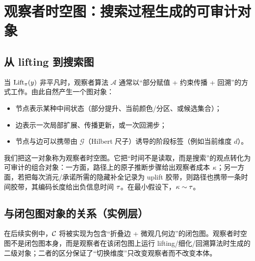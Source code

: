 \section{观察者时空图：搜索过程生成的可审计对象}

\subsection{从 lifting 到搜索图}

当 \(\mathrm{Lift}_{\pi}(y)\) 非平凡时，观察者算法 \(\mathcal A\) 通常以“部分赋值 + 约束传播 + 回溯”的方式工作。由此自然产生一个图对象：
\begin{itemize}
  \item 节点表示某种中间状态（部分提升、当前颜色/分区、或候选集合）；
  \item 边表示一次局部扩展、传播更新，或一次回溯步；
  \item 节点与边可以携带由 \(\mathcal G\)（Hilbert 尺子）诱导的阶段标签（例如当前维度 \(d\)）。
\end{itemize}
我们把这一对象称为观察者时空图。它把“时间不是读取，而是搜索”的观点转化为可审计的组合对象：一方面，路径上的原子推断步骤给出观察者成本 \(\kappa\)；另一方面，若把每次消元/承诺所需的隐藏补全记录为 uplift 胶带，则路径也携带一条时间胶带，其编码长度给出负信息时间 \(\tau\)。在最小假设下，\(\kappa\sim\tau\)。

\subsection{与闭包图对象的关系（实例层）}

在后续实例中，\(\mathcal{C}\) 将被实现为包含“折叠边 + 微观几何边”的闭包图。观察者时空图不是闭包图本身，而是观察者在该闭包图上运行 lifting/细化/回溯算法时生成的二级对象；二者的区分保证了“切换维度”只改变观察者而不改变本体。

